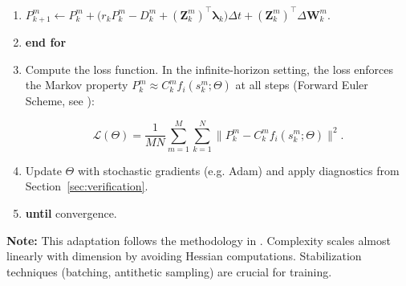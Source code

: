 ﻿\documentclass[11pt,letterpaper,oneside]{article}
\numberwithin{equation}{section}
\newcommand{\1}{\mathbf{1}}
\begin{document}
\begin{tcolorbox}[float, title={Algorithm 1: Deep BSDE Training Loop (Infinite-Horizon Adaptation)}, label={alg:deepbsde}]
\begin{enumerate}[leftmargin=1.5em,itemsep=0.5em]
      \item \quad\quad\quad $P_{k+1}^m \leftarrow P_k^m + \big(r_k P_k^m - D_k^m + (\bm{Z}_k^m)^{\top}\bm{\lambda}_k\big)\Delta t + (\bm{Z}_k^m)^{\top}\Delta\bm{W}_k^m$.

  \item \quad \textbf{end for}

    \item \quad Compute the loss function. In the infinite-horizon setting, the loss enforces the Markov property $P_k^m \approx C_k^m f_i(s_k^m;\Theta)$ at all steps (Forward Euler Scheme, see \cite{huang2025probabilistic}):

  \begin{equation*}
    \mathcal{L}(\Theta) = \frac{1}{MN}\sum_{m=1}^M\sum_{k=1}^N \big\lVert P_k^m - C_k^m f_i(s_k^m;\Theta) \big\rVert^2.
  \end{equation*}

    \item \quad Update $\Theta$ with stochastic gradients (e.g. Adam) and apply diagnostics from Section~\ref{sec:verification}.

  \item \textbf{until} convergence.

\end{enumerate}

\textbf{Note:} This adaptation follows the methodology in \cite{han2018solving,huang2025probabilistic}. Complexity scales almost linearly with dimension by avoiding Hessian computations. Stabilization techniques (batching, antithetic sampling) are crucial for training.

\end{tcolorbox}
\end{document}
